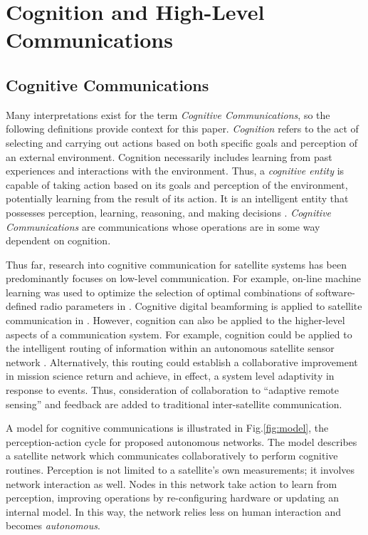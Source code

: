 \documentclass[conference]{IEEEtran}
\begin{document}

\section{Cognition and High-Level Communications} \label{sec:hlc}

\subsection{Cognitive Communications}
\label{ssec:cognit}

Many interpretations exist for the term \textit{Cognitive Communications}, so the following definitions provide context for this paper.  \textit{Cognition} refers to the act of selecting and carrying out actions based on both specific {\color{black} goals and perception of an external environment}.  Cognition necessarily includes learning from past experiences and {\color{black} interactions with the environment}.  Thus, a \textit{cognitive entity} is capable of taking action based on its {\color{black} goals and perception of the environment}, potentially learning from the result of its action.  It is an intelligent entity that possesses perception, learning, reasoning, and making decisions \cite{ref7}. \textit{Cognitive Communications} are communications whose operations are in some way dependent on cognition.

Thus far, research into cognitive communication for satellite systems has been predominantly focuses on low-level communication.  For example, on-line machine learning was used to optimize the selection of optimal combinations of software-defined radio parameters in \cite{ref4}.  Cognitive digital beamforming is applied to satellite communication in \cite{ref5}.  However, cognition can also be applied to the higher-level aspects of a communication system.  For example, cognition could be applied to the intelligent routing of information within an autonomous satellite sensor network \cite{ref7}.  Alternatively, this routing could establish a collaborative improvement in mission science return and achieve, in effect, a system level adaptivity in response to events.  Thus, consideration of collaboration to ``adaptive remote sensing'' and feedback are added to traditional inter-satellite communication.

A model for cognitive communications is illustrated in Fig.\ref{fig:model}, the perception-action cycle for proposed autonomous networks.  The model describes a satellite network which communicates collaboratively to perform cognitive routines.  Perception is not limited to a satellite's own measurements; it involves network interaction as well.  Nodes in this network take action to learn from perception, improving operations by re-configuring hardware or updating an internal model.  In this way, the network relies less on human interaction and becomes \textit{autonomous}.
\end{document}
